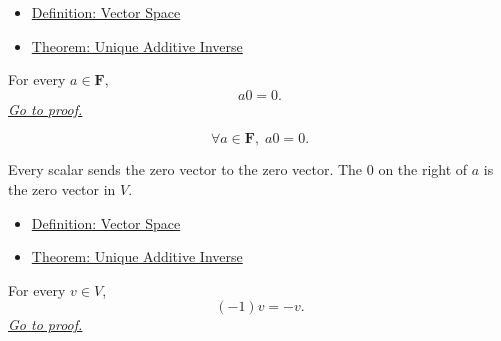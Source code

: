 \begin{remark*}[Dependencies]
\begin{itemize}
  \item \hyperref[def:vector-space]{Definition: Vector Space}
  \item \hyperref[thm:unique-additive-inverse]{Theorem: Unique Additive Inverse}
\end{itemize}
\end{remark*}


\begin{tcolorbox}[colback=thmbox, colframe=thmborder, arc=2pt,
  left=6pt, right=6pt, top=4pt, bottom=4pt,
  title={\small\textbf{Theorem ($a0=0$)}},
  fonttitle=\small\bfseries]
\begin{theorem}[$a0=0$]
\label{thm:scalar-times-zero-vector}
For every $a \in \mathbf{F}$,
\[
a0=0.
\]
\hyperref[prf:scalar-times-zero-vector]{\textit{Go to proof.}}
\end{theorem}
\end{tcolorbox}

\begin{remark*}
\[
\forall a \in \mathbf{F},\; a0=0.
\]
\end{remark*}

\begin{remark*}[Interpretation]
Every scalar sends the zero vector to the zero vector. The $0$ on the right of
$a$ is the zero vector in $V$.
\end{remark*}

\begin{remark*}[Dependencies]
\begin{itemize}
  \item \hyperref[def:vector-space]{Definition: Vector Space}
  \item \hyperref[thm:unique-additive-inverse]{Theorem: Unique Additive Inverse}
\end{itemize}
\end{remark*}


\begin{tcolorbox}[colback=thmbox, colframe=thmborder, arc=2pt,
  left=6pt, right=6pt, top=4pt, bottom=4pt,
  title={\small\textbf{Theorem ($(-1)v=-v$)}},
  fonttitle=\small\bfseries]
\begin{theorem}[$(-1)v=-v$]
\label{thm:minus-one-times-vector}
For every $v \in V$,
\[
(-1)v=-v.
\]
\hyperref[prf:minus-one-times-vector]{\textit{Go to proof.}}
\end{theorem}
\end{tcolorbox}

